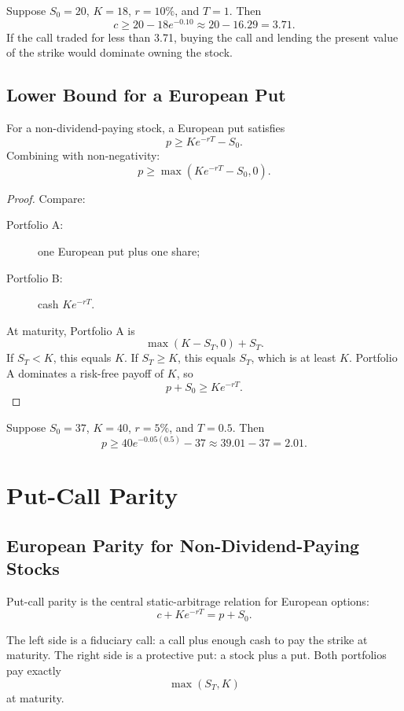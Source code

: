 \begin{exmp}
Suppose $S_0=20$, $K=18$, $r=10\%$, and $T=1$. Then
\[
    c \geq 20-18e^{-0.10}
    \approx 20-16.29
    =3.71.
\]
If the call traded for less than 3.71, buying the call and lending the present
value of the strike would dominate owning the stock.
\end{exmp}

\subsection{Lower Bound for a European Put}

For a non-dividend-paying stock, a European put satisfies
\[
    p \geq K e^{-rT}-S_0.
\]
Combining with non-negativity:
\[
    p \geq \max(K e^{-rT}-S_0,0).
\]

\begin{proof}
Compare:
\begin{description}
    \item[Portfolio A:] one European put plus one share;
    \item[Portfolio B:] cash $K e^{-rT}$.
\end{description}
At maturity, Portfolio A is
\[
    \max(K-S_T,0)+S_T.
\]
If $S_T<K$, this equals $K$. If $S_T\geq K$, this equals $S_T$, which is at
least $K$. Portfolio A dominates a risk-free payoff of $K$, so
\[
    p+S_0\geq K e^{-rT}.
\]
\end{proof}

\begin{exmp}
Suppose $S_0=37$, $K=40$, $r=5\%$, and $T=0.5$. Then
\[
    p \geq 40e^{-0.05(0.5)}-37
    \approx 39.01-37
    =2.01.
\]
\end{exmp}

\section{Put-Call Parity}

\subsection{European Parity for Non-Dividend-Paying Stocks}

Put-call parity is the central static-arbitrage relation for European options:
\[
    c + K e^{-rT} = p + S_0.
\]

The left side is a fiduciary call: a call plus enough cash to pay the strike at
maturity. The right side is a protective put: a stock plus a put. Both portfolios
pay exactly
\[
    \max(S_T,K)
\]
at maturity.

